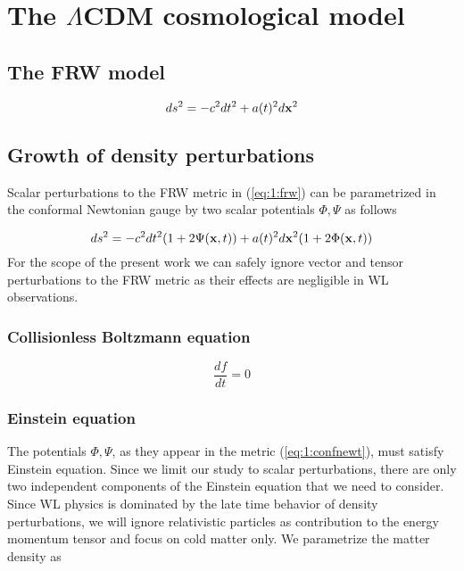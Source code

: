 
\chapter{The $\Lambda$CDM cosmological model}
\lhead[\fancyplain{}{\thepage}]{\fancyplain{}{\rightmark}}
 \thispagestyle{plain}
\setlength{\parindent}{10mm}


\section{The FRW model}

\begin{equation}
\label{eq:1:frw}
ds^2 = -c^2dt^2 + a(t)^2d\mathbf{x}^2
\end{equation}

\section{Growth of density perturbations}

Scalar perturbations to the FRW metric in (\ref{eq:1:frw}) can be parametrized in the conformal Newtonian gauge by two scalar potentials $\Phi,\Psi$ as follows

\begin{equation}
\label{eq:1:confnewt}
ds^2 = -c^2dt^2(1+2\Psi(\mathbf{x},t)) + a(t)^2d\mathbf{x}^2(1+2\Phi(\mathbf{x},t))
\end{equation}
%
For the scope of the present work we can safely ignore vector and tensor perturbations to the FRW metric as their effects are negligible in WL observations.

\subsection{Collisionless Boltzmann equation}

\begin{equation}
\label{eq:1:boltzmann}
\frac{df}{dt} = 0
\end{equation}

\subsection{Einstein equation}
The potentials $\Phi,\Psi$, as they appear in the metric (\ref{eq:1:confnewt}), must satisfy Einstein equation. Since we limit our study to scalar perturbations, there are only two independent components of the Einstein equation that we need to consider. Since WL physics is dominated by the late time behavior of density perturbations, we will ignore relativistic particles as contribution to the energy momentum tensor and focus on cold matter only. We parametrize the matter density as 

